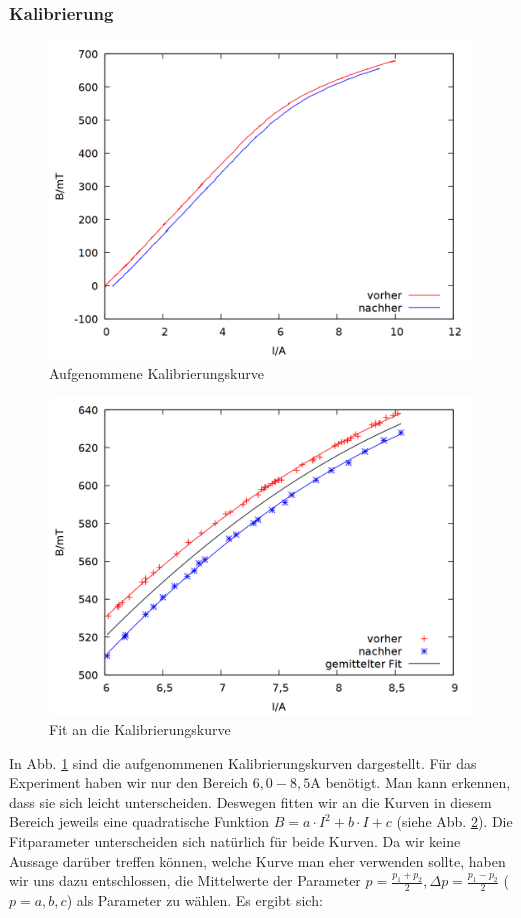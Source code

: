 \subsubsection{Kalibrierung}
\begin{figure}
\centering
\includegraphics[scale=0.3]{data/zeeman/out_kalibrierung.png}
\caption{Aufgenommene Kalibrierungskurve}
\label{fig:kal_raw}
\end{figure}
\begin{figure}
\centering
\includegraphics[scale=0.3]{data/zeeman/out_kalibrierung_edit.png}
\caption{Fit an die Kalibrierungskurve}
\label{fig:kal_raw_edit}
\end{figure}
In Abb. \ref{fig:kal_raw} sind die aufgenommenen Kalibrierungskurven dargestellt. Für das Experiment haben wir nur den Bereich $6,0 - 8,5\si{\ampere}$ benötigt. Man kann erkennen, dass sie sich leicht unterscheiden. Deswegen fitten wir an die Kurven in diesem Bereich jeweils eine quadratische Funktion $B = a\cdot I^2 + b \cdot I + c$ (siehe Abb. \ref{fig:kal_raw_edit}). Die Fitparameter unterscheiden sich natürlich für beide Kurven. Da wir keine Aussage darüber treffen können, welche Kurve man eher verwenden sollte, haben wir uns dazu entschlossen, die Mittelwerte der Parameter $p = \frac{p_1+p_2}{2} , \Delta p = \frac{p_1-p_2}{2}$ ($p = a,b,c$) als Parameter zu wählen. Es ergibt sich: 
